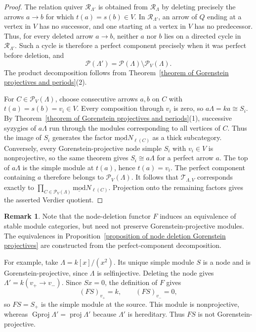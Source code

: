 \documentclass[11pt]{article}
\newcommand{\smod}{\operatorname{\underline{mod}}}
\providecommand{\varLambda}{\Lambda}
\theoremstyle{definition}
\newtheorem{remark}[theorem]{Remark}
\begin{document}
			\begin{proof}
				The relation quiver $\mathcal R_{\varLambda'}$ is obtained from $\mathcal R_{\varLambda}$ by deleting precisely the arrows $a\to b$ for which $t(a)=s(b)\in V$. In $\mathcal R_{\varLambda'}$, an arrow of $Q$ ending at a vertex in $V$ has no successor, and one starting at a vertex in $V$ has no predecessor. Thus, for every deleted arrow $a\to b$, neither $a$ nor $b$ lies on a directed cycle in $\mathcal R_{\varLambda'}$. Such a cycle is therefore a perfect component precisely when it was perfect before deletion, and
				\[
					\mathcal P(\varLambda')	=
					\mathcal P(\varLambda)\setminus
					\mathcal P_V(\varLambda).
				\]
				The product decomposition follows from Theorem~\ref{theorem of Gorenstein projectives and periods}(2).

				For $C\in\mathcal P_V(\varLambda)$, choose consecutive arrows $a,b$ on $C$ with $t(a)=s(b)=v_i\in V$. Every composition through $v_i$ is zero, so
				$a\varLambda=ka\cong S_i$. By Theorem~\ref{theorem of Gorenstein projectives and periods}(1), successive syzygies of $a\varLambda$ run through the modules
				corresponding to all vertices of $C$. Thus the image of $S_i$ generates the factor $\smod N_{\ell(C)}$ as a thick subcategory. Conversely, every Gorenstein-projective node simple $S_i$ with $v_i\in V$ is nonprojective, so the same theorem gives $S_i\cong a\varLambda$ for a perfect arrow $a$. The top of $a\varLambda$ is the simple module at $t(a)$, hence $t(a)=v_i$. The perfect component containing $a$ therefore belongs to $\mathcal P_V(\varLambda)$. It follows that $\mathcal T_{\varLambda,V}$ corresponds exactly to $\prod_{C\in\mathcal P_V(\varLambda)}\smod N_{\ell(C)}$. Projection onto the remaining factors gives the asserted Verdier quotient.
			\end{proof}


			\begin{remark}
				\label{remark of node functor and Gorenstein projectives}
				Note that the node-deletion functor $F$ induces an equivalence of
				stable module categories, but need not preserve Gorenstein-projective
				modules.
				The equivalences in
				Proposition~\ref{proposition of node deletion Gorenstein projectives}
				are constructed from the perfect-component decomposition.

				For example, take $\varLambda=k[x]/(x^2)$.
				Its unique simple module $S$ is a node and is Gorenstein-projective,
				since $\varLambda$ is selfinjective.
				Deleting the node gives $\varLambda'=k(v_+\rightarrow v_-)$.
				Since $Sx=0$, the definition of $F$ gives
				\[
					(FS)_{v_+}=k,\qquad (FS)_{v_-}=0,
				\]
				so $FS=S_+$ is the simple module at the source.
				This module is nonprojective, whereas
				$\operatorname{Gproj}\varLambda'=\operatorname{proj}\varLambda'$
				because $\varLambda'$ is hereditary.
				Thus $FS$ is not Gorenstein-projective.
			\end{remark}
\end{document}
